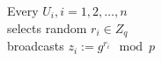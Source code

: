 \documentclass[varwidth,convert={size=1000x}]{standalone}
\begin{document}
Every $U_i, i = 1, 2, \dots, n$\\
selects random $r_i \in Z_q$\\
broadcasts $z_i := g^{r_i} \mod p$
\end{document}
